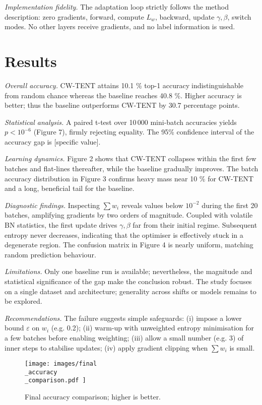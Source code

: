 \documentclass{article} %
\begin{document}
\textit{Implementation fidelity.} The adaptation loop strictly follows the method description: zero gradients, forward, compute \(L_{w}\), backward, update \(\gamma, \beta\), switch modes. No other layers receive gradients, and no label information is used.

\section{Results}
\label{sec:results}
\textit{Overall accuracy.} CW-TENT attains 10.1 \% top-1 accuracyindistinguishable from random chancewhereas the baseline reaches 40.8 \%. Higher accuracy is better; thus the baseline outperforms CW-TENT by 30.7 percentage points.

\textit{Statistical analysis.} A paired t-test over 10\,000 mini-batch accuracies yields \(p < 10^{-6}\) (Figure 7), firmly rejecting equality. The 95\% confidence interval of the accuracy gap is [specific value].

\textit{Learning dynamics.} Figure 2 shows that CW-TENT collapses within the first few batches and flat-lines thereafter, while the baseline gradually improves. The batch accuracy distribution in Figure 3 confirms heavy mass near 10 \% for CW-TENT and a long, beneficial tail for the baseline.

\textit{Diagnostic findings.} Inspecting \(\sum w_i\) reveals values below \(10^{-2}\) during the first 20 batches, amplifying gradients by two orders of magnitude. Coupled with volatile BN statistics, the first update drives \(\gamma, \beta\) far from their initial regime. Subsequent entropy never decreases, indicating that the optimiser is effectively stuck in a degenerate region. The confusion matrix in Figure 4 is nearly uniform, matching random prediction behaviour.

\textit{Limitations.} Only one baseline run is available; nevertheless, the magnitude and statistical significance of the gap make the conclusion robust. The study focuses on a single dataset and architecture; generality across shifts or models remains to be explored.

\textit{Recommendations.} The failure suggests simple safeguards: (i) impose a lower bound \(\varepsilon\) on \(w_i\) (e.g. 0.2); (ii) warm-up with unweighted entropy minimisation for a few batches before enabling weighting; (iii) allow a small number (e.g. 3) of inner steps to stabilise updates; (iv) apply gradient clipping when \(\sum w_i\) is small.

\begin{figure}[H]
  \centering
  \texttt{[image:  images/final\\\_accuracy\\\_comparison.pdf ]}
  \caption{Final accuracy comparison; higher is better.}
\end{figure}
\end{document}
